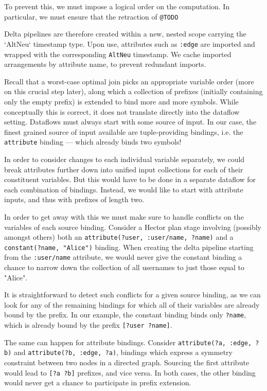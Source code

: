 \documentclass[../index.tex]{subfiles}
\begin{document}
To prevent this, we must impose a logical order on the computation. In
particular, we must ensure that the retraction of \texttt{@TODO}

Delta pipelines are therefore created within a new, nested scope
carrying the `AltNeu` timestamp type. Upon use, attributes such as
\texttt{:edge} are imported and wrapped with the corresponding
\texttt{AltNeu} timestamp. We cache imported arrangements by attribute
name, to prevent redundant imports.

Recall that a worst-case optimal join picks an appropriate variable
order (more on this crucial step later), along which a collection of
prefixes (initially containing only the empty prefix) is extended to
bind more and more symbols. While conceptually this is correct, it
does not translate directly into the dataflow setting. Dataflows must
always start with some source of input. In our case, the finest
grained source of input available are tuple-providing bindings,
i.e. the \texttt{attribute} binding — which already binds two symbols!

In order to consider changes to each individual variable separately,
we could break attributes further down into unified input collections
for each of their constituent variables. But this would have to be
done in a separate dataflow for each combination of bindings. Instead,
we would like to start with attribute inputs, and thus with prefixes
of length two.

In order to get away with this we must make sure to handle conflicts
on the variables of each source binding. Consider a Hector plan stage
involving (possibly amongst others) both an \texttt{attribute(?user,
  :user/name, ?name)} and a \texttt{constant(?name, "Alice")}
binding. When creating the delta pipeline starting from the
\texttt{:user/name} attribute, we would never give the constant
binding a chance to narrow down the collection of all usernames to
just those equal to "Alice".

It is straightforward to detect such conflicts for a given source
binding, as we can look for any of the remaining bindings for which
all of their variables are already bound by the prefix. In our
example, the constant binding binds only \texttt{?name}, which is
already bound by the prefix \texttt{[?user ?name]}.

The same can happen for attribute bindings. Consider
\texttt{attribute(?a, :edge, ?b)} and \texttt{attribute(?b, :edge,
  ?a)}, bindings which express a symmetry constraint between two nodes
in a directed graph. Sourcing the first attribute would lead to
\texttt{[?a ?b]} prefixes, and vice versa. In both cases, the other
binding would never get a chance to participate in prefix extension.
\end{document}
